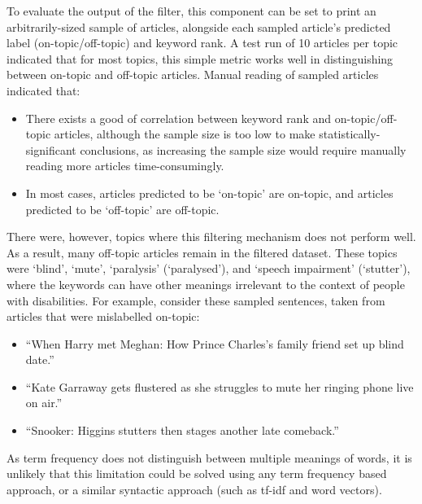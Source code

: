 \documentclass{report}
\begin{document}
To evaluate the output of the filter, this component can be set to print an arbitrarily-sized sample of articles, alongside each sampled article's predicted label (on-topic/off-topic) and keyword rank.
A test run of 10 articles per topic indicated that for most topics, this simple metric works well in distinguishing between on-topic and off-topic articles.
Manual reading of sampled articles indicated that:
\begin{itemize}
	\item There exists a good of correlation between keyword rank and on-topic/off-topic articles, although the sample size is too low to make statistically-significant conclusions, as increasing the sample size would require manually reading more articles time-consumingly.
	\item In most cases, articles predicted to be `on-topic' are on-topic, and articles predicted to be `off-topic' are off-topic.
\end{itemize}

There were, however, topics where this filtering mechanism does not perform well.
As a result, many off-topic articles remain in the filtered dataset.
These topics were `blind', `mute', `paralysis' (`paralysed'), and `speech impairment' (`stutter'), where the keywords can have other meanings irrelevant to the context of people with disabilities.
For example, consider these sampled sentences, taken from articles that were mislabelled on-topic:
\begin{itemize}
	\item ``When Harry met Meghan: How Prince Charles's family friend set up blind date.''
	\item ``Kate Garraway gets flustered as she struggles to mute her ringing phone live on air.''
	\item ``Snooker: Higgins stutters then stages another late comeback.''
\end{itemize}
As term frequency does not distinguish between multiple meanings of words, it is unlikely that this limitation could be solved using any term frequency based approach, or a similar syntactic approach (such as tf-idf and word vectors).
\end{document}
